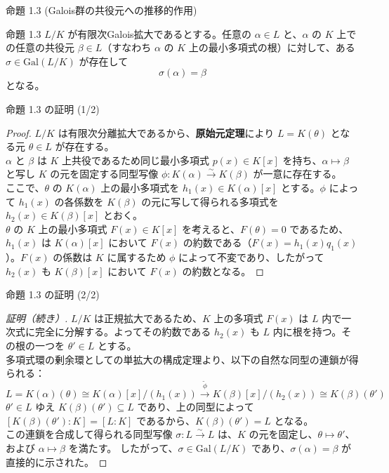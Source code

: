 \documentclass[aspectratio=169,11pt,unicode]{beamer}
\begin{document}
\begin{frame}{命題 1.3 (Galois群の共役元への推移的作用)}
\begin{block}{命題 1.3}
$L/K$ が有限次Galois拡大であるとする。任意の $\alpha \in L$ と、$\alpha$ の $K$ 上での任意の共役元 $\beta \in L$（すなわち $\alpha$ の $K$ 上の最小多項式の根）に対して、ある $\sigma \in \mathrm{Gal}(L/K)$ が存在して
\[ \sigma(\alpha) = \beta \]
となる。
\end{block}
\end{frame}

\begin{frame}{命題 1.3 の証明 (1/2)}
\begin{proof}
$L/K$ は有限次分離拡大であるから、\textbf{原始元定理}により $L = K(\theta)$ となる元 $\theta \in L$ が存在する。\\
$\alpha$ と $\beta$ は $K$ 上共役であるため同じ最小多項式 $p(x) \in K[x]$ を持ち、$\alpha \mapsto \beta$ と写し $K$ の元を固定する同型写像 $\phi: K(\alpha) \xrightarrow{\sim} K(\beta)$ が一意に存在する。\\
ここで、$\theta$ の $K(\alpha)$ 上の最小多項式を $h_1(x) \in K(\alpha)[x]$ とする。$\phi$ によって $h_1(x)$ の各係数を $K(\beta)$ の元に写して得られる多項式を $h_2(x) \in K(\beta)[x]$ とおく。\\
$\theta$ の $K$ 上の最小多項式 $F(x) \in K[x]$ を考えると、$F(\theta)=0$ であるため、$h_1(x)$ は $K(\alpha)[x]$ において $F(x)$ の約数である（$F(x) = h_1(x)q_1(x)$）。$F(x)$ の係数は $K$ に属するため $\phi$ によって不変であり、したがって $h_2(x)$ も $K(\beta)[x]$ において $F(x)$ の約数となる。
\end{proof}
\end{frame}

\begin{frame}{命題 1.3 の証明 (2/2)}
\begin{proof}[証明（続き）]
$L/K$ は正規拡大であるため、$K$ 上の多項式 $F(x)$ は $L$ 内で一次式に完全に分解する。よってその約数である $h_2(x)$ も $L$ 内に根を持つ。その根の一つを $\theta' \in L$ とする。\\
多項式環の剰余環としての単拡大の構成定理より、以下の自然な同型の連鎖が得られる：
\[ L = K(\alpha)(\theta) \cong K(\alpha)[x]/(h_1(x)) \xrightarrow{\tilde{\phi}} K(\beta)[x]/(h_2(x)) \cong K(\beta)(\theta') \]
$\theta' \in L$ ゆえ $K(\beta)(\theta') \subseteq L$ であり、上の同型によって $[K(\beta)(\theta') : K] = [L : K]$ であるから、$K(\beta)(\theta') = L$ となる。\\
この連鎖を合成して得られる同型写像 $\sigma: L \xrightarrow{\sim} L$ は、$K$ の元を固定し、$\theta \mapsto \theta'$、および $\alpha \mapsto \beta$ を満たす。
したがって、$\sigma \in \mathrm{Gal}(L/K)$ であり、$\sigma(\alpha) = \beta$ が直接的に示された。
\end{proof}
\end{frame}
\end{document}
